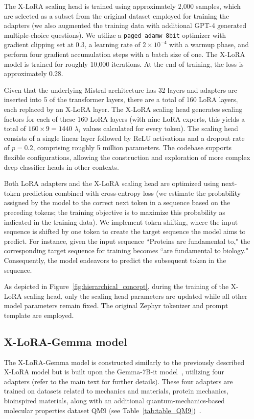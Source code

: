 The X-LoRA scaling head is trained using approximately 2,000 samples, which are selected as a subset from the original dataset employed for training the adapters (we also augmented the training data with additional GPT-4 generated multiple-choice questions). We utilize a \texttt{paged\_adamw\_8bit} optimizer with gradient clipping set at 0.3, a learning rate of $2\times 10^{-4}$ with a warmup phase, and perform four gradient accumulation steps with a batch size of one. The X-LoRA model is trained for roughly 10,000 iterations. At the end of training, the loss is approximately 0.28.

Given that the underlying Mistral architecture has 32 layers and adapters are inserted into 5 of the transformer layers, there are a total of 160 LoRA layers, each replaced by an X-LoRA layer. The X-LoRA scaling head generates scaling factors for each of these 160 LoRA layers (with nine LoRA experts, this yields a total of $160 \times 9 = 1440$ $\lambda_i$ values calculated for every token). The scaling head consists of a single linear layer followed by ReLU activations and a dropout rate of $p=0.2$, comprising roughly 5 million parameters. The codebase supports flexible configurations, allowing the construction and exploration of more complex deep classifier heads in other contexts.

Both LoRA adapters and the X-LoRA scaling head are optimized using next-token prediction combined with cross-entropy loss (we estimate the probability assigned by the model to the correct next token in a sequence based on the preceding tokens; the training objective is to maximize this probability as indicated in the training data). We implement token shifting, where the input sequence is shifted by one token to create the target sequence the model aims to predict. For instance, given the input sequence ``Proteins are fundamental to," the corresponding target sequence for training becomes ``are fundamental to biology." Consequently, the model endeavors to predict the subsequent token in the sequence.

As depicted in Figure~\ref{fig:hierarchical_concept}, during the training of the X-LoRA scaling head, only the scaling head parameters are updated while all other model parameters remain fixed. The original Zephyr tokenizer and prompt template are employed.

\subsection{X-LoRA-Gemma model} The X-LoRA-Gemma model is constructed similarly to the previously described X-LoRA model but is built upon the Gemma-7B-it model~\cite{Google/gemma-7b-itFace}, utilizing four adapters (refer to the main text for further details). These four adapters are trained on datasets related to mechanics and materials, protein mechanics, bioinspired materials, along with an additional quantum-mechanics-based molecular properties dataset QM9 (see Table~\ref{tab:table_QM9})~\cite{Ruddigkeit2012EnumerationGDB-17,Ramakrishnan2015ElectronicSpace}.

